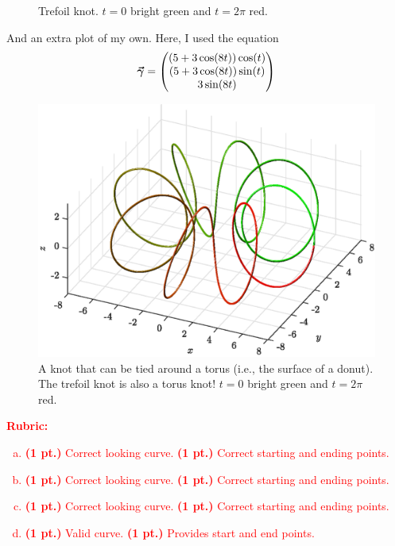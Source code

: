 \documentclass[12pt]{article} %
\begin{document}
\begin{solution}
\begin{enumerate}[(a)]
\begin{figure}[H]
        \caption{Trefoil knot. $t=0$ bright green and $t=2\pi$ red.}
    \end{figure}
\end{enumerate}
\item And an extra plot of my own. Here, I used the equation
\[
\boldsymbol{\vec{\gamma}} = \begin{pmatrix} (5+3\cos(8t))\cos(t) \\ (5+3\cos(8t))\sin(t) \\ 3\sin(8t) \end{pmatrix}
\]
\begin{figure}[H]
    \centering
    \includegraphics[width=.8\textwidth]{figures/torus_knot}
    \caption{A knot that can be tied around a torus (i.e., the surface of a donut). The trefoil knot is also a torus knot!  $t=0$ bright green and $t=2\pi$ red.}
\end{figure}
\end{solution}
\textcolor{red}{
\noindent \textbf{Rubric:}
\begin{enumerate}[(a)]
    \item \textbf{(1 pt.)} Correct looking curve. \textbf{(1 pt.)} Correct starting and ending points.
    \item \textbf{(1 pt.)} Correct looking curve. \textbf{(1 pt.)} Correct starting and ending points.
    \item \textbf{(1 pt.)} Correct looking curve. \textbf{(1 pt.)} Correct starting and ending points.
    \item \textbf{(1 pt.)} Valid curve. \textbf{(1 pt.)} Provides start and end points.
\end{enumerate}
}
\newpage
\end{document}
